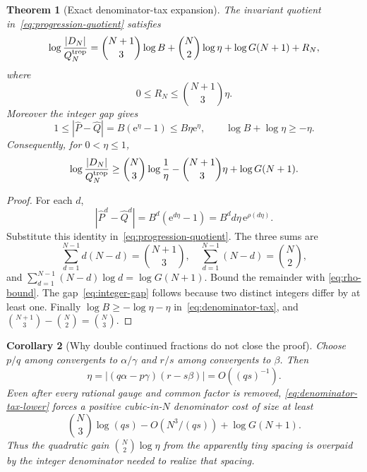 \documentclass[11pt]{article}
\newcommand{\e}{\mathrm e}
\newcommand{\1}{\mathbf 1}
\theoremstyle{plain}
\newtheorem{theorem}{Theorem}[section]
\newtheorem{corollary}[theorem]{Corollary}
\theoremstyle{definition}
\theoremstyle{remark}
\begin{document}
\begin{theorem}[Exact denominator-tax expansion]\label{thm:denominator-tax}
The invariant quotient in~\eqref{eq:progression-quotient} satisfies
\begin{equation}\label{eq:denominator-tax}
 \log\frac{|D_N|}{Q_N^{\rm trop}}
 =\binom{N+1}{3}\log B
  +\binom N2\log\eta
  +\log G(N+1)+R_N,
\end{equation}
where
\begin{equation}\label{eq:R-bound}
 0\le R_N\le\binom{N+1}{3}\eta.
\end{equation}
Moreover the integer gap gives
\begin{equation}\label{eq:integer-gap}
 1\le|\widehat P-\widehat Q|
 =B(\e^\eta-1)\le B\eta\e^\eta,
 \qquad
 \log B+\log\eta\ge-\eta.
\end{equation}
Consequently, for $0<\eta\le1$,
\begin{equation}\label{eq:denominator-tax-lower}
 \log\frac{|D_N|}{Q_N^{\rm trop}}
 \ge\binom N3\log\frac1\eta
   -\binom{N+1}{3}\eta+\log G(N+1).
\end{equation}
\end{theorem}

\begin{proof}
For each $d$,
\[
 |\widehat P^d-\widehat Q^d|
 =B^d(\e^{d\eta}-1)
 =B^d d\eta\,\e^{\rho(d\eta)}.
\]
Substitute this identity in~\eqref{eq:progression-quotient}.  The three sums
are
\[
 \sum_{d=1}^{N-1}d(N-d)=\binom{N+1}{3},\quad
 \sum_{d=1}^{N-1}(N-d)=\binom N2,
\]
and
$\sum_{d=1}^{N-1}(N-d)\log d=\log G(N+1)$.  Bound the remainder with
\eqref{eq:rho-bound}.  The gap~\eqref{eq:integer-gap} follows because two
distinct integers differ by at least one.  Finally
$\log B\ge-\log\eta-\eta$ in~\eqref{eq:denominator-tax}, and
$\binom{N+1}{3}-\binom N2=\binom N3$.
\end{proof}

\begin{corollary}[Why double continued fractions do not close the proof]
\label{cor:double-cf-no-go}
Choose $p/q$ among convergents to $\alpha/\gamma$ and $r/s$ among convergents
to $\beta$.  Then
\[
 \eta=|(q\alpha-p\gamma)(r-s\beta)|=O((qs)^{-1}).
\]
Even after every rational gauge and common factor is removed,
\eqref{eq:denominator-tax-lower} forces a positive cubic-in-$N$ denominator
cost of size at least
\[
 \binom N3\log(qs)-O(N^3/(qs))+\log G(N+1).
\]
Thus the quadratic gain $\binom N2\log\eta$ from the apparently tiny spacing
is overpaid by the integer denominator needed to realize that spacing.
\end{corollary}
\end{document}
